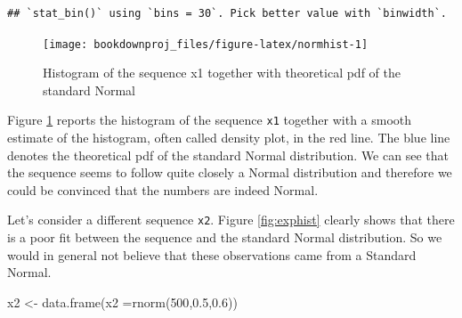 \documentclass[
]{book}
\newenvironment{Shaded}{\begin{snugshade}}{\end{snugshade}}
\newcommand{\AttributeTok}[1]{\textcolor[rgb]{0.77,0.63,0.00}{#1}}
\newcommand{\DecValTok}[1]{\textcolor[rgb]{0.00,0.00,0.81}{#1}}
\newcommand{\FloatTok}[1]{\textcolor[rgb]{0.00,0.00,0.81}{#1}}
\newcommand{\FunctionTok}[1]{\textcolor[rgb]{0.00,0.00,0.00}{#1}}
\newcommand{\NormalTok}[1]{#1}
\newcommand{\OtherTok}[1]{\textcolor[rgb]{0.56,0.35,0.01}{#1}}
\theoremstyle{definition}
\theoremstyle{definition}
\theoremstyle{definition}
\theoremstyle{definition}
\theoremstyle{remark}
\begin{document}
\begin{verbatim}
## `stat_bin()` using `bins = 30`. Pick better value with `binwidth`.
\end{verbatim}

\begin{figure}

{\centering \texttt{[image: bookdownproj\_files/figure-latex/normhist-1]} 

}

\caption{Histogram of the sequence x1 together with theoretical pdf of the standard Normal}\label{fig:normhist}
\end{figure}

Figure \ref{fig:normhist} reports the histogram of the sequence \texttt{x1} together with a smooth estimate of the histogram, often called density plot, in the red line. The blue line denotes the theoretical pdf of the standard Normal distribution. We can see that the sequence seems to follow quite closely a Normal distribution and therefore we could be convinced that the numbers are indeed Normal.

Let's consider a different sequence \texttt{x2}. Figure \ref{fig:exphist} clearly shows that there is a poor fit between the sequence and the standard Normal distribution. So we would in general not believe that these observations came from a Standard Normal.

\begin{Shaded}
\begin{Highlighting}[]
\NormalTok{x2 }\OtherTok{\textless{}{-}} \FunctionTok{data.frame}\NormalTok{(}\AttributeTok{x2 =}\FunctionTok{rnorm}\NormalTok{(}\DecValTok{500}\NormalTok{,}\FloatTok{0.5}\NormalTok{,}\FloatTok{0.6}\NormalTok{))}
\end{Highlighting}
\end{Shaded}
\end{document}
